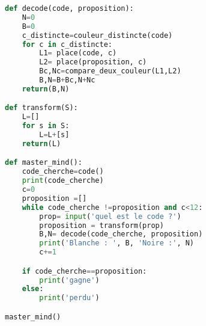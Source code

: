 \documentclass[a4paper, 11pt,reqno]{article}
\begin{document}
\begin{correction}
\begin{lstlisting}[language=Python]
def decode(code, proposition):
    N=0
    B=0
    c_distincte=couleur_distincte(code)
    for c in c_distincte:
        L1= place(code, c)
        L2= place(proposition, c)
        Bc,Nc=compare_deux_couleur(L1,L2)
        B,N=B+Bc,N+Nc
    return(B,N)

def transform(S):
    L=[]
    for s in S:
        L=L+[s]
    return(L)

def master_mind():
    code_cherche=code()
    print(code_cherche)
    c=0 
    proposition =[]
    while code_cherche !=proposition and c<12:
        prop= input('quel est le code ?')
        proposition = transform(prop)
        B,N= decode(code_cherche, proposition)
        print('Blanche : ', B, 'Noire :', N)
        c+=1

    if code_cherche==proposition:
        print('gagne')
    else:
        print('perdu')

master_mind()


\end{lstlisting}



\end{correction}
\end{document}
